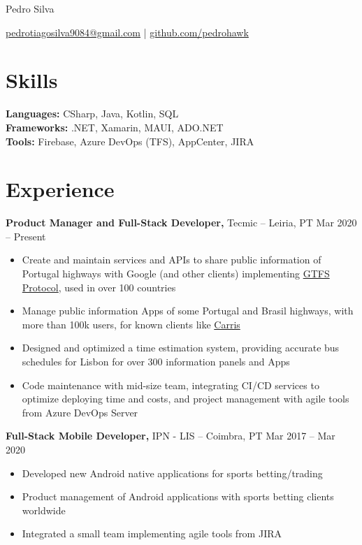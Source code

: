 \documentclass[11pt]{article}       %
\begin{document}
\centerline{\Huge Pedro Silva}

\vspace{5pt}

\centerline{\href{mailto:pedrotiagosilva9084@gmail.com}{pedrotiagosilva9084@gmail.com} | \href{https://github.com/pedrohawk}{github.com/pedrohawk}}

\vspace{-10pt}

\section*{Skills}
\textbf{Languages:} CSharp, Java, Kotlin, SQL \\
\textbf{Frameworks:} .NET, Xamarin, MAUI, ADO.NET \\
\textbf{Tools:} Firebase, Azure DevOps (TFS), AppCenter, JIRA \\

\vspace{-6.5pt}

\section*{Experience}
\textbf{Product Manager and Full-Stack Developer,} {Tecmic} -- Leiria, PT \hfill Mar 2020 -- Present \\
\vspace{-9pt}
\begin{itemize}
  \item Create and maintain services and APIs to share public information of Portugal highways with Google (and other clients) implementing \href{https://gtfs.org/getting-started/what-is-GTFS/}{GTFS Protocol}, used in over 100 countries
  \item Manage public information Apps of some Portugal and Brasil highways, with more than 100k users, for known clients like \href{https://play.google.com/store/search?q=carris&c=apps}{Carris}
  \item Designed and optimized a time estimation system, providing accurate bus schedules for Lisbon for over 300 information panels and Apps
  \item Code maintenance with mid-size team, integrating CI/CD services to optimize deploying time and costs, and project management with agile tools from Azure DevOps Server
\end{itemize}

\textbf{Full-Stack Mobile Developer,} {IPN - LIS} -- Coimbra, PT \hfill Mar 2017 -- Mar 2020 \\
\vspace{-9pt}
\begin{itemize}
  \item Developed new Android native applications for sports betting/trading
  \item Product management of Android applications with sports betting clients worldwide
  \item Integrated a small team implementing agile tools from JIRA
\end{itemize}
\end{document}
